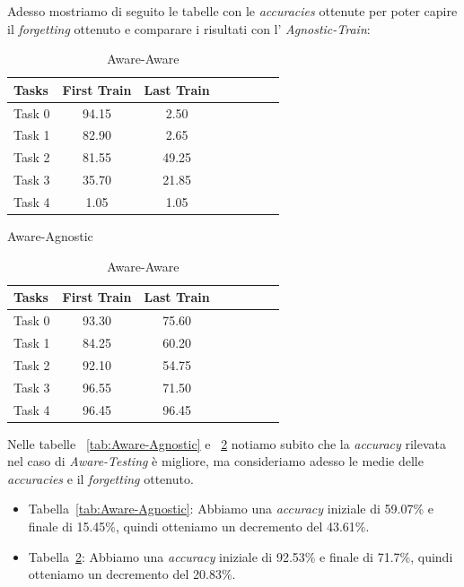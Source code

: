 Adesso mostriamo di seguito le tabelle con le \textit{accuracies} ottenute per poter capire il \textit{forgetting} ottenuto e comparare i risultati con l' \textit{Agnostic-Train}:
\begin{table}[!htb]
\begin{minipage}{.5\linewidth}
    \centering

    \label{tab:Aware-Agnostic }

    \medskip

\begin{tabular}{l*{6}{c}r}
Tasks   & First Train & Last Train\\
\hline
   Task 0      &     94.15      &       2.50\\
   Task 1      &     82.90      &       2.65\\
   Task 2      &     81.55      &      49.25\\
   Task 3      &     35.70      &      21.85\\
   Task 4      &      1.05      &       1.05\\
\end{tabular}
\caption{Aware-Agnostic}
\label{tab:Aware-Agnostic}
\end{minipage}\hfill
\begin{minipage}{.5\linewidth}
    \centering

    \label{tab:Aware-Aware}

    \medskip

\begin{tabular}{l*{6}{c}r}
Tasks   & First Train  & Last Train\\
\hline
   Task 0      &     93.30      &      75.60\\
   Task 1      &     84.25      &      60.20\\
   Task 2      &     92.10      &      54.75\\
   Task 3      &     96.55      &      71.50\\
   Task 4      &     96.45      &      96.45\\
\end{tabular}
\caption{Aware-Aware}
\label{tab:Aware-Aware}
\end{minipage}
\end{table}
\newline
Nelle tabelle ~\ref{tab:Aware-Agnostic} e ~\ref{tab:Aware-Aware} notiamo subito che la \textit{accuracy} rilevata nel caso di \textit{Aware-Testing} è migliore, ma consideriamo adesso le medie delle \textit{accuracies} e il \textit{forgetting} ottenuto.
\begin{itemize}
    \item Tabella~\ref{tab:Aware-Agnostic}: Abbiamo una \textit{accuracy} iniziale di 59.07\% e finale di 15.45\%, quindi otteniamo un decremento del 43.61\%.
    \item Tabella~\ref{tab:Aware-Aware}: Abbiamo una \textit{accuracy} iniziale di 92.53\% e finale di 71.7\%, quindi otteniamo un decremento del 20.83\%.
\end{itemize}
